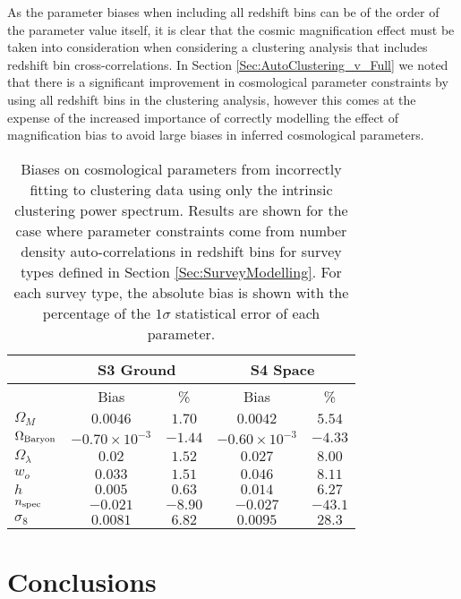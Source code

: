 \documentclass[useAMS,usenatbib,times,letter,amssymb]{mn2e}
\begin{document}
As the parameter biases when including all redshift bins can be of the order of the parameter value itself, it is clear that the cosmic magnification effect must be taken into consideration when considering a clustering analysis that includes redshift bin cross-correlations. In Section \ref{Sec:AutoClustering_v_Full} we noted that there is a significant improvement in cosmological parameter constraints by using all redshift bins in the clustering analysis, however this comes at the expense of the increased importance of correctly modelling the effect of magnification bias to avoid large biases in inferred cosmological parameters.

\begin{table*}
\begin{minipage}{126mm}
\centering
\begin{tabular}[]{l | c | c | c | c }
\hline
& \multicolumn{2}{|c|}{S3 Ground}&\multicolumn{2}{c|}{S4 Space} \\
\hline

& Bias & \% & Bias & \%\\
\hline
$\Omega_M$  & 			$0.0046$& 			$1.70$ & 	$0.0042$ & 			$5.54$\\
$\Omega_{\rm Baryon}$  &	$-0.70\times10^{-3}$& 	$-1.44$ & 	$-0.60\times10^{-3}$& 	$-4.33$\\
$\Omega_{\lambda}$  & 		$0.02$& 				$1.52$ & 	$0.027$& 				$8.00$\\
$w_o$  & 					$0.033$& 				$1.51$ & 	$0.046$& 				$8.11$\\
$h$ & 					$0.005$ & 			$0.63$ & 	$0.014$& 				$6.27$\\
$n_{\rm spec}$ & 			$-0.021$& 			$-8.90$ & 	$-0.027$& 			$-43.1$\\
$\sigma_8$  & 				$0.0081$& 			$6.82$ & 	$0.0095$& 			$28.3$\\
\hline
\end{tabular}
\caption{Biases on cosmological parameters from incorrectly fitting to clustering data using only the intrinsic clustering power spectrum. Results are shown for the case where parameter constraints come from number density auto-correlations in redshift bins for survey types defined in Section \ref{Sec:SurveyModelling}.  For each survey type, the absolute bias is shown with the percentage of the $1\sigma$ statistical error of each parameter.}\label{Table:ParameterBiasResults}
\end{minipage}
\end{table*}

\section{Conclusions}
\end{document}

